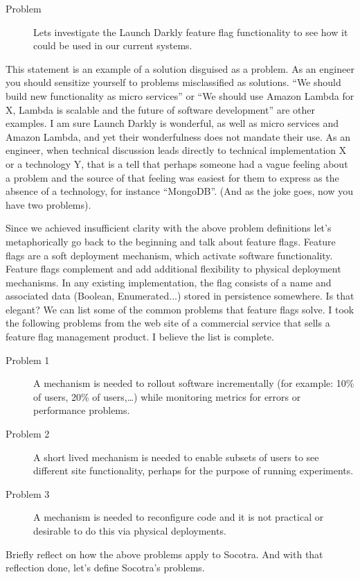 \begin{description}
\item[Problem] Lets investigate the Launch Darkly feature flag functionality to see how it could be used in our current systems.
\end{description}
This statement is an example of a
solution disguised as a problem. As an engineer you should sensitize yourself to problems misclassified as solutions.
``We should build new functionality as micro services'' or
``We should use Amazon Lambda for X, Lambda is scalable and the future of software development'' are other examples. I am sure Launch Darkly is wonderful,
as well as micro services and Amazon Lambda, and yet their wonderfulness does not mandate their use. As an engineer, when technical discussion 
leads directly to technical implementation X or a technology Y, that is a tell that perhaps someone had a vague feeling about a
problem and the source of that feeling was easiest for them to express as the absence of a technology, for instance ``MongoDB''. (And as the joke goes, now
you have two problems).

Since we achieved insufficient clarity with the above problem definitions let's metaphorically go back to the beginning and talk about feature
flags. Feature flags are a soft deployment mechanism, which activate software functionality. Feature flags complement and add additional
flexibility to physical deployment mechanisms. In any existing implementation, the flag consists of a name and associated data (Boolean,
Enumerated...) stored in persistence somewhere. Is that elegant? We can list some of the common problems that feature flags solve. I took
the following problems from the web site of a commercial service that sells a feature flag management product. I believe the list is complete.

\begin{description}
  \item[Problem 1] A mechanism is needed to rollout software incrementally (for example: 10\% of users, 20\% of users,\dots) while monitoring
  metrics for errors or performance problems.
  \item[Problem 2] A short lived mechanism is needed to enable subsets of users to see different site functionality, perhaps for the purpose of
  running experiments.
  \item[Problem 3] A mechanism is needed to reconfigure code and it is not practical or desirable to do this via physical deployments.
\end{description}
Briefly reflect on how the above problems apply to Socotra. And with that reflection done, let's define Socotra's
problems.

